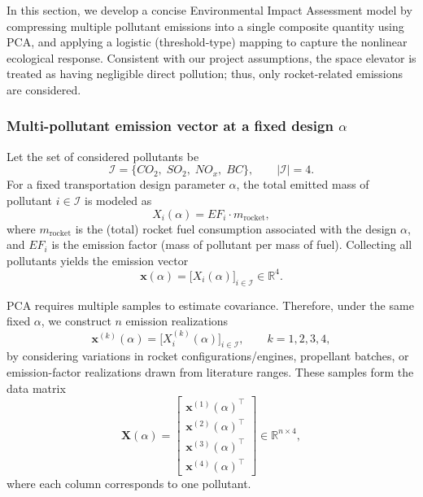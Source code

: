 \documentclass{mcmthesis}
\begin{document}
In this section, we develop a concise Environmental Impact Assessment model by compressing multiple pollutant emissions into a single composite quantity using PCA, and applying a logistic (threshold-type) mapping to capture the nonlinear ecological response. Consistent with our project assumptions, the space elevator is treated as having negligible direct pollution; thus, only rocket-related emissions are considered.

\subsubsection{Multi-pollutant emission vector at a fixed design $\alpha$}
Let the set of considered pollutants be
\[
\mathcal{I}=\{CO_2,\;SO_2,\;NO_x,\;BC\}, \qquad |\mathcal{I}|=4.
\]
For a fixed transportation design parameter $\alpha$, the total emitted mass of pollutant $i\in\mathcal{I}$ is modeled as
\begin{equation}
X_i(\alpha)=EF_i\cdot m_{\text{rocket}},
\label{eq:env_Xi_alpha_simple}
\end{equation}
where $m_{\text{rocket}}$ is the (total) rocket fuel consumption associated with the design $\alpha$, and $EF_i$ is the emission factor (mass of pollutant per mass of fuel). Collecting all pollutants yields the emission vector
\begin{equation}
\mathbf{x}(\alpha)=\big[X_i(\alpha)\big]_{i\in\mathcal{I}}\in\mathbb{R}^{4}.
\label{eq:env_x_vector}
\end{equation}

PCA requires multiple samples to estimate covariance. Therefore, under the same fixed $\alpha$, we construct $n$ emission realizations
\[
\mathbf{x}^{(k)}(\alpha)=\big[X^{(k)}_i(\alpha)\big]_{i\in\mathcal{I}},\qquad k=1,2,3,4,
\]
by considering variations in rocket configurations/engines, propellant batches, or emission-factor realizations drawn from literature ranges. These samples form the data matrix
\begin{equation}
\mathbf{X}(\alpha)=
\begin{bmatrix}
\mathbf{x}^{(1)}(\alpha)^\top\\
\mathbf{x}^{(2)}(\alpha)^\top\\
\mathbf{x}^{(3)}(\alpha)^\top\\
\mathbf{x}^{(4)}(\alpha)^\top
\end{bmatrix}\in\mathbb{R}^{n\times 4},
\label{eq:env_X_matrix}
\end{equation}
where each column corresponds to one pollutant.
\end{document}
